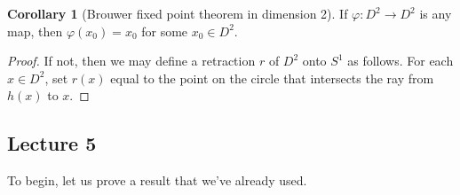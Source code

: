 \documentclass[10pt,letterpaper,cm]{nupset}
\theoremstyle{definition}
\theoremstyle{theorem}
\newtheorem{corollary}[definition]{Corollary}
\theoremstyle{remark}
\newcommand{\1}{\mathbb{1}}
\newcommand{\0}{\vec 0}
\begin{document}
\begin{corollary}[Brouwer fixed point theorem in dimension 2]
If $\varphi : D^2 \to D^2$ is  any map, then $\varphi(x_0) = x_0$ for some $x_0 \in D^2$.
\end{corollary}
\begin{proof}
If not, then we may define a retraction $r$ of $D^2$ onto $S^1$ as follows. For each $x\in D^2$, set $r(x)$ equal to the point on the circle that intersects  the ray from $h(x)$ to $x$. 
\end{proof}

\subsection{Lecture 5}

To begin, let us prove a result that we've already used.
\end{document}

